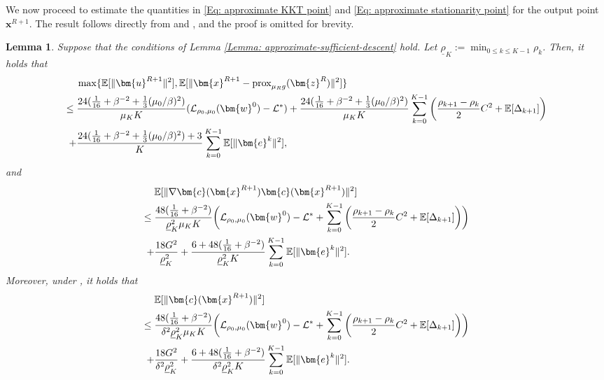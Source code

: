 \documentclass{article}
\theoremstyle{plain}
\newtheorem{lemma}{Lemma}[section]
\theoremstyle{definition}
\theoremstyle{remark}
\newcommand{\EE}{\mathbb{E}}
\newcommand{\prox}{\mathrm{prox}}
\newcommand{\bx}{\bm{x}}
\newcommand{\bc}{\bm{c}}
\newcommand{\be}{\bm{e}}
\newcommand{\bu}{\bm{u}}
\newcommand{\bz}{\bm{z}}
\newcommand{\calL}{\mathcal{L}}
\newcommand{\bw}{\bm{w}}
\newcommand{\sumK}{\sum_{k=0}^{K-1}}
\numberwithin{equation}{section}
\begin{document}
We now proceed to estimate the quantities in \eqref{Eq: approximate KKT point} and \eqref{Eq: approximate stationarity point} for the output point $\bx^{R+1}$. The result follows directly from 
and , and the proof is omitted for brevity.
\begin{lemma}
    \label{Lemma: the error bound of the infeasible stationarity in expectation}
    Suppose that
    the conditions of Lemma \ref{Lemma: approximate-sufficient-descent}
    hold. Let $\underline{\rho}_K:=\min_{0\leq k\leq K-1}\rho_k$. Then, it holds that
\begin{align}
        & \max\{ \EE[\| \bu^{R+1}\|^{2}],
        \EE [\| \bx^{R+1}- \prox_{\mu_R g}(\bz^{R})\|^{2}]\} \notag \\
        \leq{} & \frac{24( \tfrac{1}{16} + \beta^{-2}+ \tfrac{1}{3}(\mu_{0}/ \beta)^{2})}{\mu_{K}K}
        (\calL_{\rho_0, \mu_0}(\bw^{0}) - \calL^{*})
        + \frac{24( \tfrac{1}{16} + \beta^{-2}+ \tfrac{1}{3}(\mu_{0}/ \beta)^{2})}{\mu_{K}K}
        \sumK \left( \frac{\rho_{k+1}- \rho_{k}}{2} C^{2} + \EE[\Delta_{k+1}] \right)
        \notag\\
        +{} & \frac{24( \tfrac{1}{16} + \beta^{-2}+ \tfrac{1}{3}(\mu_{0}/ \beta)^{2}) + 3}{K}
        \sumK \EE[\| \be^{k}\|^{2}],
        \label{Eq: the criticality measure error bound in expectation}
    \end{align}
    and
\begin{align}
        & \EE [\|\nabla \bc(\bx^{R+1}) \bc(\bx^{R+1}) \|^{2}] \notag\\
        \leq{} & \frac{48(\tfrac{1}{16}+ \beta^{-2})}{\underline{\rho}_K^{2}\mu_{K}K}
        \biggl(\calL_{\rho_0, \mu_0}(\bw^{0}) - \calL^{*}
        + \sumK \left( \frac{\rho_{k+1}- \rho_{k}}{2}C^{2}
        + \EE [\Delta_{k+1}] \right) \biggr) \notag \\
        +{} & \frac{18 G^{2}}{\underline{\rho}_K^{2}}
        + \frac{6 + 48(\tfrac{1}{16}+ \beta^{-2})}{\underline{\rho}_K^{2}K }
        \sumK \EE[\| \be^{k}\|^{2}].
        \label{Eq: the infeasible stationarity error bound in expectation}
    \end{align}
    Moreover, under , it holds that
\begin{align}
        & \EE[\| \bc(\bx^{R+1}) \|^{2}] \notag\\
        \leq{} & \frac{48(\tfrac{1}{16}+ \beta^{-2})}{\delta^{2}\underline{\rho}_K^{2}\mu_{K}K}
        \biggl(\calL_{\rho_0, \mu_0}(\bw^{0}) - \calL^{*}
        + \sumK \left( \frac{\rho_{k+1}- \rho_{k}}{2}C^{2}
        + \EE[ \Delta_{k+1}] \right) \biggr) \notag\\
       +{} & \frac{18 G^{2}}{\delta^{2}\underline{\rho}_K^{2}}
       +\frac{6 + 48(\tfrac{1}{16}+ \beta^{-2})} {\delta^{2}\underline{\rho}_K^{2}K }
       \sumK \EE[\| \be^{k}\|^{2}].
       \label{Eq: the constraints violations error bound in expectation}
    \end{align}
    
\end{lemma}
\end{document}
